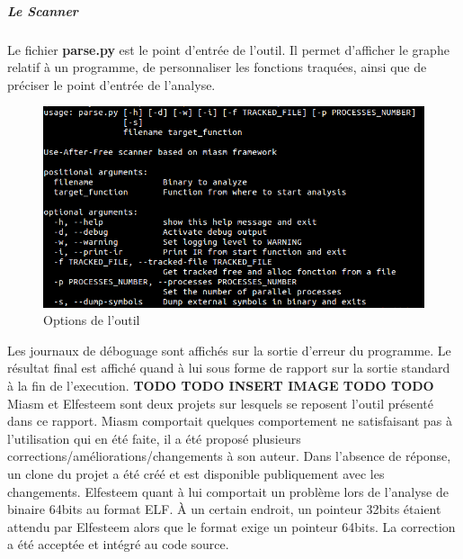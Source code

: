 \subparagraph{Le Scanner}
Le fichier \textbf{parse.py} est le point d'entrée de l'outil. Il permet d'afficher le graphe relatif à un programme, de personnaliser les fonctions traquées, ainsi que de préciser
le point d'entrée de l'analyse.
\begin{figure}[h]
    \centering
    \includegraphics[scale=0.3]{options-parse.png}\newline
    \caption{Options de l'outil}
\end{figure}
Les journaux de déboguage sont affichés sur la sortie d'erreur du programme. Le résultat final est affiché quand à lui sous forme de rapport sur la sortie standard à la fin de l'execution.
\textbf{TODO TODO INSERT IMAGE TODO TODO}
Miasm et Elfesteem sont deux projets sur lesquels se reposent l'outil présenté dans ce rapport. Miasm comportait quelques comportement ne satisfaisant pas à l'utilisation qui en été faite,
il a été proposé plusieurs corrections/améliorations/changements à son auteur. Dans l'absence de réponse, un clone du projet a été créé et est disponible publiquement avec les changements.
Elfesteem quant à lui comportait un problème lors de l'analyse de binaire 64bits au format ELF. À un certain endroit, un pointeur 32bits étaient attendu par Elfesteem alors que le format
exige un pointeur 64bits. La correction a été acceptée et intégré au code source.

